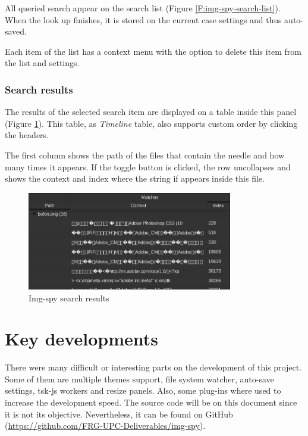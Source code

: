 All queried search appear on the search list (Figure
\ref{F:img-spy-search-list}). When the look up finishes, it is stored on the
current case settings and thus auto-saved.

Each item of the list has a context menu with the option to delete this item
from the list and settings.

\subsubsection{Search results}

The results of the selected search item are displayed on a table inside this
panel (Figure \ref{F:img-spy-search-results}). This table, as \textit{Timeline}
table, also supports custom order by clicking the headers.

The first column shows the path of the files that contain the needle and 
how many times it appears. If the toggle button is clicked, the row
uncollapses and shows the context and index where the string if appears inside
this file.

\begin{figure}[htb]
	\begin{center}
		\includegraphics[width=0.8\textwidth]
		{./figures/search-results.png}
		\caption{Img-spy search results}
		\label{F:img-spy-search-results}
	\end{center}
\end{figure}

\section{Key developments}

There were many difficult or interesting parts on the development of this 
project. Some of them are multiple themes support, file system watcher, 
auto-save settings, tsk-js workers and resize panels. Also, some plug-ins where
used to increase the development speed. The source code will be on this document
since it is not its objective. Nevertheless, it can be found on GitHub
(\url{https://github.com/FRG-UPC-Deliverables/img-spy}).


